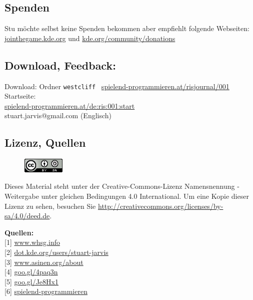 \documentclass[10pt,a4paper,ngerman,twoside]{article} %
\newcommand{\SepRule}{\noindent	%
\begin{center}
\rule{250pt}{1pt} %
\end{center}
}
\begin{document}
\begin{multicols}{3}
\subsection*{Spenden}
Stu möchte selbst keine Spenden bekommen aber empfiehlt folgende Webseiten:
\href{http://jointhegame.kde.org}{jointhegame.kde.org} und \href{http://www.kde.org/community/donations/index.php}{kde.org/community/donations}

\subsection*{Download, Feedback:}
\footnotesize{
Download: Ordner \texttt{westcliff} \Mundus\ \href{http://spielend-programmieren.at/risjournal/001}{spielend-programmieren.at/risjournal/001}\\
Startseite:\\
\href{http://spielend-programmieren.at/de:ris:001:start}{spielend-programmieren.at/de:ris:001:start}\\ 
\Letter\: stuart.jarvis@gmail.com (Englisch)\\}
\normalsize
 
\subsection*{Lizenz, Quellen}
\begin{figure}
\includegraphics[width=2cm]{ccbysa88x31.png} \\ 
\end{figure}
Dieses Material steht unter der Creative-Commons-Lizenz Namensnennung - Weitergabe unter gleichen Bedingungen 4.0 International. Um eine Kopie dieser Lizenz zu sehen, besuchen Sie \url{http://creativecommons.org/licenses/by-sa/4.0/deed.de}.

\textbf{Quellen:} \\
{[}1{]} \href{http://www.whsg.info}{www.whsg.info} \\
{[}2{]} \href{http://dot.kde.org/users/stuart-jarvis}{dot.kde.org/users/stuart-jarvis} \\
{[}3{]} \href{http://www.asinen.org/about/}{www.asinen.org/about} \\
{[}4{]} \href{http://goo.gl/4paq3n}{goo.gl/4paq3n} \\
{[}5{]} \href{http://goo.gl/Je8Hx1}{goo.gl/Je8Hx1} \\
{[}6{]} \href{http://spielend-programmieren.at}{spielend-programmieren}

\end{multicols}
\end{document}
